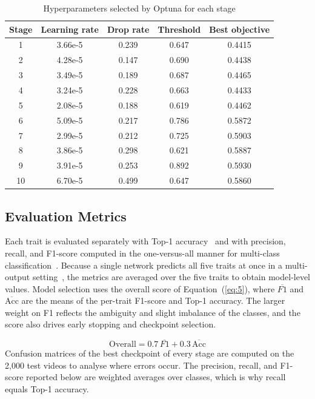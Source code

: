 \documentclass[10pt,a4paper,twocolumn]{article}
\begin{document}
\begin{table}[t]
  \caption{Hyperparameters selected by Optuna for each stage}
  \label{tab:2}
  \centering
  \footnotesize
  \setlength{\tabcolsep}{3pt}
  \begin{tabular}{ccccc}
    \toprule
    Stage & Learning rate & Drop rate & Threshold & Best objective \\
    \midrule
    1 & 3.66e-5 & 0.239 & 0.647 & 0.4415 \\
    2 & 4.28e-5 & 0.147 & 0.690 & 0.4438 \\
    3 & 3.49e-5 & 0.189 & 0.687 & 0.4465 \\
    4 & 3.24e-5 & 0.228 & 0.663 & 0.4433 \\
    5 & 2.08e-5 & 0.188 & 0.619 & 0.4462 \\
    6 & 5.09e-5 & 0.217 & 0.786 & 0.5872 \\
    7 & 2.99e-5 & 0.212 & 0.725 & 0.5903 \\
    8 & 3.86e-5 & 0.298 & 0.621 & 0.5887 \\
    9 & 3.91e-5 & 0.253 & 0.892 & 0.5930 \\
    10 & 6.70e-5 & 0.499 & 0.647 & 0.5860 \\
    \bottomrule
  \end{tabular}
\end{table}

\subsection{Evaluation Metrics}
Each trait is evaluated separately with Top-1 accuracy~\cite{touvron} and with precision, recall, and F1-score computed in the one-versus-all manner for multi-class classification~\cite{sokolova}. Because a single network predicts all five traits at once in a multi-output setting~\cite{alzhrani}, the metrics are averaged over the five traits to obtain model-level values. Model selection uses the overall score of Equation~(\ref{eq:5}), where $\overline{F1}$ and $\overline{\text{Acc}}$ are the means of the per-trait F1-score and Top-1 accuracy. The larger weight on F1 reflects the ambiguity and slight imbalance of the classes, and the score also drives early stopping and checkpoint selection.

\begin{equation}
  \text{Overall} = 0.7\,\overline{F1} + 0.3\,\overline{\text{Acc}}
  \label{eq:5}
\end{equation}
Confusion matrices of the best checkpoint of every stage are computed on the 2,000 test videos to analyse where errors occur. The precision, recall, and F1-score reported below are weighted averages over classes, which is why recall equals Top-1 accuracy.
\end{document}

